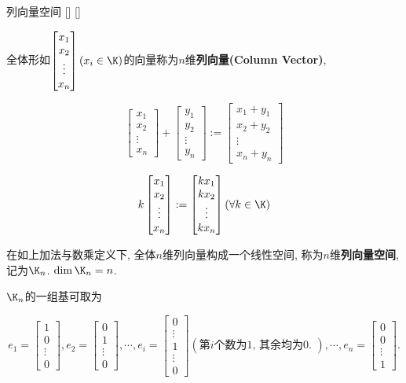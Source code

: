 \documentclass[UTF8]{ctexart}
\begin{document}
		\begin{xmp}
			[]
			{列向量空间}
			[]
			[]

			全体形如$\begin{bmatrix}x_1\\x_2\\\vdots\\x_n\end{bmatrix}(x_i\in\K)$的向量称为$n$维\textbf{列向量(Column Vector)}, 
			
			\[\begin{bmatrix}x_1\\x_2\\\vdots\\x_n\end{bmatrix}
			+\begin{bmatrix}y_1\\y_2\\\vdots\\y_n\end{bmatrix}
			:=
			\begin{bmatrix}x_1+y_1\\x_2+y_2\\\vdots\\x_n+y_n\end{bmatrix}\]
			
			\[k\begin{bmatrix}x_1\\x_2\\\vdots\\x_n\end{bmatrix}
			:=
			\begin{bmatrix}kx_1\\kx_2\\\vdots\\kx_n\end{bmatrix}(\forall k\in\K)\]
			
			在如上加法与数乘定义下, 全体$n$维列向量构成一个线性空间, 称为$n$维\textbf{列向量空间}, 记为$\K_n$. $\dim \K_n=n$. 
			
			$\K_n$的一组基可取为
			
			\[e_1=\begin{bmatrix}1\\0\\\vdots\\0\end{bmatrix},
			e_2=\begin{bmatrix}0\\1\\\vdots\\0\end{bmatrix},
			\cdots, 
			e_i=\begin{bmatrix}0\\\vdots\\1\\\vdots\\0\end{bmatrix}(\mbox{第$i$个数为$1$, 其余均为$0$. }), 
			\cdots, 
			e_n=\begin{bmatrix}0\\0\\\vdots\\1\end{bmatrix}. \]
			

\end{xmp}
\end{document}
